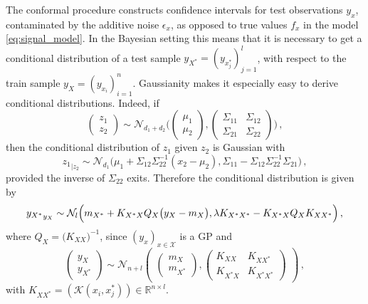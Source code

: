 \documentclass[a4paper]{article}
\newcommand{\Ncal}{\mathcal{N}}
\newcommand{\Kcal}{\mathcal{K}}
\newcommand{\Xcal}{\mathcal{X}}
\newcommand{\Real}{\mathbb{R}}
\begin{document}
The conformal procedure constructs confidence intervals for test observations $y_x$,
contaminated by the additive noise $\epsilon_x$, as opposed to true values $f_x$ in
the model \ref{eq:signal_model}. In the Bayesian setting this means that it is necessary
to get a conditional distribution of a test sample $y_{X^*} = (y_{x^*_j})_{j=1}^l$,
with respect to the train sample $y_X = (y_{x_i})_{i=1}^n$. Gaussianity makes it
especially easy to derive conditional distributions. Indeed, if
\begin{equation*}
  \begin{pmatrix}z_1 \\ z_2\end{pmatrix}
    \sim \Ncal_{d_1+d_2}\Biggl(
      \begin{pmatrix} \mu_1 \\ \mu_2 \end{pmatrix},
      \begin{pmatrix}
        \Sigma_{11} & \Sigma_{12} \\
        \Sigma_{21} & \Sigma_{22}
      \end{pmatrix}
    \Biggr)
    \,,
\end{equation*}
then the conditional distribution of $z_1$ given $z_2$ is Gaussian with
\begin{equation*}
  {z_1}_{|z_2}
    \sim \Ncal_{d_1}\bigl(
      \mu_1 + \Sigma_{12}\Sigma_{22}^{-1}(x_2-\mu_2),
      \Sigma_{11} - \Sigma_{12}\Sigma_{22}^{-1}\Sigma_{21}
    \bigr)
    \,,
\end{equation*}
provided the inverse of $\Sigma_{22}$ exits. Therefore the conditional distribution
is given by
\begin{equation} \label{eq:cond_distr}
  {y_{X^*}}_{y_X}
    \sim \Ncal_l\Bigl(
      m_{X^*} + K_{X^*X} Q_X \bigl(y_X - m_X\bigr),
      \lambda K_{X^*X^*} - K_{X^*X} Q_X K_{XX^*}
    \Bigr)
    \,,
\end{equation}
where $Q_X = \bigl(K_{XX}\bigr)^{-1}$, since $(y_x)_{x\in\Xcal}$ is a GP and
\begin{equation*}
  \begin{pmatrix} y_X \\ y_{X^*} \end{pmatrix}
    \sim \Ncal_{n+l}\begin{pmatrix}
      \begin{pmatrix} m_X \\ m_{X^*} \end{pmatrix},
      \begin{pmatrix}
        K_{XX} & K_{XX^*} \\
        K_{X^*X} & K_{X^*X^*}
      \end{pmatrix}
    \end{pmatrix}
    \,,
\end{equation*}
with $K_{XX^*} = (\Kcal(x_i, x^*_j))\in \Real^{n\times l}$.
\end{document}

